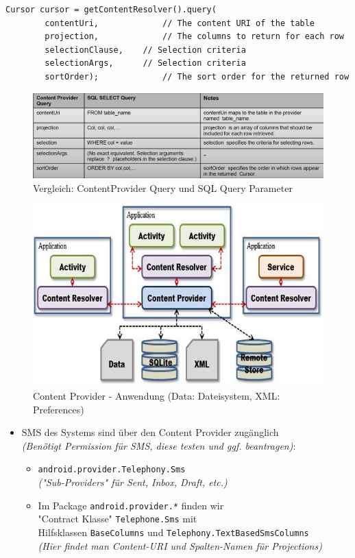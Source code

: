 \documentclass[a4paper]{article}
\begin{document}
\begin{lstlisting}
Cursor cursor = getContentResolver().query( 
		contentUri, 			// The content URI of the table 
		projection, 			// The columns to return for each row 
		selectionClause, 	// Selection criteria 
		selectionArgs, 		// Selection criteria 
		sortOrder); 			// The sort order for the returned row
\end{lstlisting}
	
\begin{figure}[htb!]
	\centering
	\includegraphics[width=\textwidth]{img/compare_query.png}
	\caption{Vergleich: ContentProvider Query und SQL Query Parameter}
\end{figure}

\begin{figure}[htb!]
	\centering
	\includegraphics[width=.7\textwidth]{img/contentprovider.jpg}
	\caption{Content Provider - Anwendung (Data: Dateisystem, XML: Preferences)}
\end{figure}

\newpage

\begin{itemize}
	\item SMS des Systems sind über den Content Provider zugänglich\\
	\textit{(Benötigt Permission für SMS, diese testen und ggf. beantragen)}:
		\begin{itemize}
			\item \texttt{android.provider.Telephony.Sms}\\
			\textit{("Sub-Providers" für Sent, Inbox, Draft, etc.)}
			\item Im Package \texttt{android.provider.*} finden wir \\
			"Contract Klasse" \texttt{Telephone.Sms} mit \\
			Hilfsklassen \texttt{BaseColumns} und \texttt{Telephony.TextBasedSmsColumns}\\
			\textit{(Hier findet man Content-URI und Spalten-Namen für Projections)}
		\end{itemize}
\end{itemize}
\end{document}
